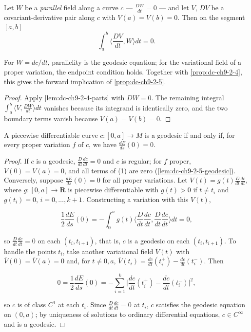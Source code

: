 \begin{lemma}
  \label{lem:dc-ch9-2-5-geodesic}


  Let $W$ be a \emph{parallel} field along a curve $c$ --- $\frac{DW}{dt}=0$ --- and let
  $V$, $DV$ be a covariant-derivative pair along $c$ with $V(a)=V(b)=0$. Then on the
  segment $[a,b]$
  $$
  \int_a^b\Big\langle\frac{DV}{dt},W\Big\rangle dt=0.
  $$

  For $W=dc/dt$, parallelity is the geodesic equation; for the variational
  field of a proper variation, the endpoint condition holds. Together with
  \cref{prop:dc-ch9-2-4}, this gives the forward implication of
  \cref{prop:dc-ch9-2-5}.
\end{lemma}
\begin{proof}

  \sketch
  Apply \cref{lem:dc-ch9-2-4-parts} with $DW=0$. The remaining integral
  $\int_a^b\langle V,\frac{DW}{dt}\rangle dt$ vanishes because its integrand is
  identically zero, and the two boundary terms vanish because $V(a)=V(b)=0$.
\end{proof}
\begin{proposition}
  \label{prop:dc-ch9-2-5}
  A piecewise differentiable curve $c:[0,a]\to M$ is a geodesic if and only if, for
  every proper variation $f$ of $c$, we have $\frac{dE}{ds}(0)=0$.
\end{proposition}
\begin{proof}
  \sketch
  If $c$ is a geodesic, $\frac{D}{dt}\frac{dc}{dt}=0$ and $c$ is regular;
  for $f$ proper, $V(0)=V(a)=0$, and all terms of (1) are zero
  (\cref{lem:dc-ch9-2-5-geodesic}). Conversely, suppose
  $\frac{dE}{ds}(0)=0$ for all proper variations. Let
  $V(t)=g(t)\frac{D}{dt}\frac{dc}{dt}$, where $g:[0,a]\to\mathbf{R}$ is piecewise
  differentiable with $g(t)>0$ if $t\ne t_i$ and $g(t_i)=0$, $i=0,\dots,k+1$.
  Constructing a variation
  with this $V(t)$,

  $$
  \frac{1}{2}\frac{dE}{ds}(0)=-\int_0^a g(t)\Big\langle\frac{D}{dt}\frac{dc}{dt},\frac{D}{dt}\frac{dc}{dt}\Big\rangle dt=0,
  $$

  so $\frac{D}{dt}\frac{dc}{dt}=0$ on each $(t_i,t_{i+1})$, that is, $c$ is a geodesic
  on each $(t_i,t_{i+1})$. To handle the points $t_i$, take another variational field
  $\overline V(t)$ with $\overline V(0)=\overline V(a)=0$ and, for $t\ne 0,a$,
  $\overline V(t_i)=\frac{dc}{dt}(t_i^+)-\frac{dc}{dt}(t_i^-)$. Then

  $$
  0=\frac{1}{2}\frac{dE}{ds}(0)=-\sum_{i=1}^k\Big|\frac{dc}{dt}(t_i^+)-\frac{dc}{dt}(t_i^-)\Big|^2,
  $$

  so $c$ is of class $C^1$ at each $t_i$. Since $\frac{D}{dt}\frac{dc}{dt}=0$ at
  $t_i$, $c$ satisfies the geodesic equation on $(0,a)$; by uniqueness of solutions
  to ordinary differential equations, $c\in C^\infty$ and is a geodesic.
\end{proof}
